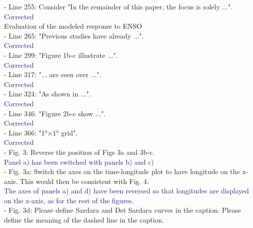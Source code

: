 \documentclass[12pt]{article}
\newcommand{\resp}[1]{\textcolor{MidnightBlue}{#1}}
\begin{document}
- Line 255: Consider "In the remainder of this paper, the focus is solely ...".\\

\resp{Corrected}\\

Evaluation of the modeled response to ENSO\\

- Line 265: "Previous studies have already ...".\\

\resp{Corrected}\\

- Line 299: "Figure 1b-c illustrate ...".\\

\resp{Corrected}	\\

- Line 317: "... are seen over ...".\\

\resp{Corrected}\\

- Line 324: "As shown in ...". \\

\resp{Corrected}\\

- Line 346: "Figure 2b-c show ...".\\

\resp{Corrected}\\

- Line 366: "1°×1° grid".\\

\resp{Corrected} \\

- Fig. 3: Reverse the position of Figs 3a and 3b-c.\\

\resp{Panel a) has been switched with panels b) and c) } \\

- Fig. 3a: Switch the axes on the time-longitude plot to have longitude on the x-axis. This would then be consistent with Fig. 4.\\

\resp{The axes of panels a) and d) have been reversed so that longitudes are displayed on the x-axis, as for the rest of the figures.} \\

- Fig. 3d: Please define Sardara and Det Sardara curves in the caption. Please define the meaning of the dashed line in the caption.\\
\end{document}
